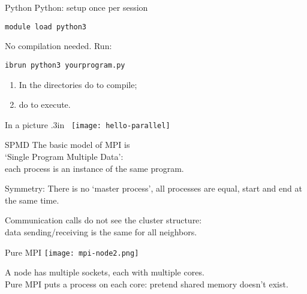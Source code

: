 \begin{python}
  \addtocounter{slidecount}{-1}
\begin{numberedframe}{Python}
 Python: setup once per session
\begin{verbatim}
module load python3
\end{verbatim}
No compilation needed. Run:
\begin{verbatim}
ibrun python3 yourprogram.py
\end{verbatim}
\end{numberedframe}
\end{python}

\begin{exerciseframe}[hello]
  

  \begin{enumerate}
  \item In the directories  do 
     to compile;
  \item do  to execute.
  \end{enumerate}
\end{exerciseframe}

\begin{numberedframe}{In a picture}
  \moveleft .3in \hbox\bgroup
  \texttt{[image: hello-parallel]}
  \egroup
\end{numberedframe}

\begin{numberedframe}{SPMD}
  The basic model of MPI is\\
  `Single Program Multiple Data':\\
  each process is an instance of the same program.

  Symmetry: There is no `master process', all processes are equal,
  start and end
  at the same time.

  Communication calls do not see the cluster structure:\\
  data sending/receiving is the same for all neighbors.
\end{numberedframe}


\begin{numberedframe}{Pure MPI}
  \texttt{[image: mpi-node2.png]}

  A node has multiple sockets, each with multiple cores.\\
  Pure MPI puts a process on each core: pretend shared memory doesn't exist.
\end{numberedframe}

